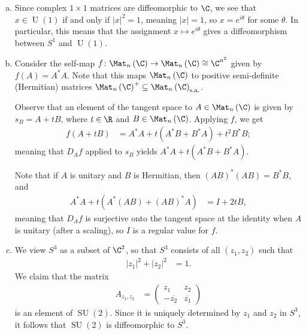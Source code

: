 \documentclass[10pt]{mypackage}
\begin{document}
\begin{solution}\hfill
  \begin{enumerate}[(a)]
    \item Since complex $1\times 1$ matrices are diffeomorphic to $\C$, we see that $x\in \operatorname{U}(1)$ if and only if $\left\vert x \right\vert^2 = 1$, meaning $\left\vert x \right\vert = 1$, so $x = e^{i\theta}$ for some $\theta$. In particular, this means that the assignment $x\mapsto e^{i\theta}$ gives a diffeomorphism between $S^{1}$ and $\operatorname{U}(1)$.
    \item Consider the self-map $f\colon \Mat_{n}\left( \C \right)\rightarrow \Mat_{n}\left( \C \right)\cong \C^{n^2}$ given by $f(A) = A^{\ast}A$. Note that this maps $\Mat_{n}\left( \C \right)$ to positive semi-definite (Hermitian) matrices $\Mat_{n}\left( \C \right)^{+}\subseteq \Mat_{n}\left( \C \right)_{\operatorname{s.a.}}$.\newline

      Observe that an element of the tangent space to $A\in \Mat_{n}\left( \C \right)$ is given by $ s_B = A + tB $, where $t\in \R$ and $B\in \Mat_{n}\left( \C \right)$. Applying $f$, we get
      \begin{align*}
        f\left( A + tB \right) &= A^{\ast}A + t\left( A^{\ast}B + B^{\ast}A \right) + t^2 B^{\ast}B;
      \end{align*}
      meaning that $D_Af$ applied to $s_B$ yields $A^{\ast}A + t\left( A^{\ast}B + B^{\ast}A \right)$.\newline

      Note that if $A$ is unitary and $B$ is Hermitian, then $\left( AB \right)^{\ast}\left( AB \right) = B^{\ast}B$, and
      \begin{align*}
        A^{\ast}A + t\left( A^{\ast}\left( AB \right) + \left( AB \right)^{\ast}A \right) &= I + 2tB,
      \end{align*}
      meaning that $D_Af$ is surjective onto the tangent space at the identity when $A$ is unitary (after a scaling), so $I$ is a regular value for $f$.
    \item We view $S^{3}$ as a subset of $\C^{2}$, so that $S^{3}$ consists of all $\left( z_1,z_2 \right)$ such that
      \begin{align*}
        \left\vert z_1 \right\vert^2 + \left\vert z_2 \right\vert^2 &= 1.
      \end{align*}
      We claim that the matrix
      \begin{align*}
        A_{z_1,z_2} &= \begin{pmatrix}z_1 & z_2 \\ - \overline{z_2} & \overline{z_1}\end{pmatrix}
      \end{align*}
      is an element of $\operatorname{SU}\left( 2 \right)$. Since it is uniquely determined by $z_1$ and $z_2$ in $S^{3}$, it follows that $\operatorname{SU}(2)$ is diffeomorphic to $S^{3}$.\newline


\end{enumerate}
\end{solution}
\end{document}
